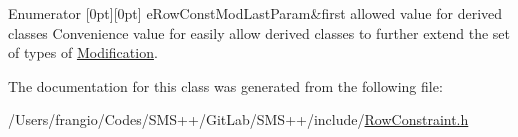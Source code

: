 \begin{DoxyEnumFields}{Enumerator}
[0pt][0pt]{}\mbox{\label{class_s_m_spp__di__unipi__it_1_1_row_constraint_mod_af91e41a206e988d55a31347acd6f5d33a826d05be074e812b037364a3d58a38c6}} 
e\+Row\+Const\+Mod\+Last\+Param&first allowed value for derived classes Convenience value for easily allow derived classes to further extend the set of types of \mbox{\hyperlink{class_s_m_spp__di__unipi__it_1_1_modification}{Modification}}. \\
\hline

\end{DoxyEnumFields}


The documentation for this class was generated from the following file\+:\begin{DoxyCompactItemize}
\item 
/\+Users/frangio/\+Codes/\+S\+M\+S++/\+Git\+Lab/\+S\+M\+S++/include/\mbox{\hyperlink{_row_constraint_8h}{Row\+Constraint.\+h}}\end{DoxyCompactItemize}
